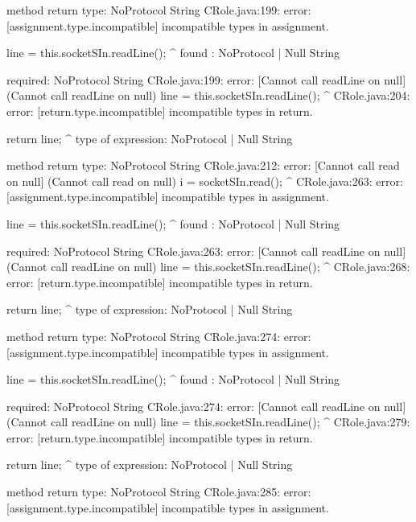 \begin{code}
  method return type: NoProtocol String
CRole.java:199: error: [assignment.type.incompatible] incompatible types in assignment.

            line = this.socketSIn.readLine();
                                          ^
  found   : NoProtocol | Null String

  required: NoProtocol String
CRole.java:199: error: [Cannot call readLine on null] (Cannot call readLine on null)
            line = this.socketSIn.readLine();
                                          ^
CRole.java:204: error: [return.type.incompatible] incompatible types in return.

        return line;
               ^
  type of expression: NoProtocol | Null String

  method return type: NoProtocol String
CRole.java:212: error: [Cannot call read on null] (Cannot call read on null)
                i = socketSIn.read();
                                  ^
CRole.java:263: error: [assignment.type.incompatible] incompatible types in assignment.

            line = this.socketSIn.readLine();
                                          ^
  found   : NoProtocol | Null String

  required: NoProtocol String
CRole.java:263: error: [Cannot call readLine on null] (Cannot call readLine on null)
            line = this.socketSIn.readLine();
                                          ^
CRole.java:268: error: [return.type.incompatible] incompatible types in return.

        return line;
               ^
  type of expression: NoProtocol | Null String

  method return type: NoProtocol String
CRole.java:274: error: [assignment.type.incompatible] incompatible types in assignment.

            line = this.socketSIn.readLine();
                                          ^
  found   : NoProtocol | Null String

  required: NoProtocol String
CRole.java:274: error: [Cannot call readLine on null] (Cannot call readLine on null)
            line = this.socketSIn.readLine();
                                          ^
CRole.java:279: error: [return.type.incompatible] incompatible types in return.

        return line;
               ^
  type of expression: NoProtocol | Null String

  method return type: NoProtocol String
CRole.java:285: error: [assignment.type.incompatible] incompatible types in assignment.


\end{code}
